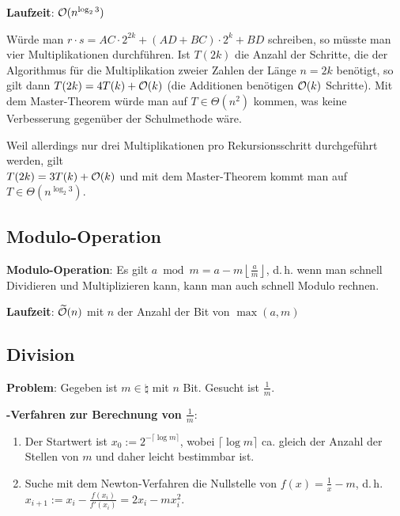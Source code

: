 \textbf{Laufzeit}:
$\mathcal{O}(n^{\log_2 3})$

\begin{Beweis}
    Würde man $r \cdot s = AC \cdot 2^{2k} + (AD + BC) \cdot 2^k + BD$ schreiben,
    so müsste man vier Multiplikationen durchführen.
    Ist $T(2k)$ die Anzahl der Schritte, die der Algorithmus für die Multiplikation zweier
    Zahlen der Länge $n = 2k$ benötigt, so gilt dann
    $T(2k) = 4T(k) + \mathcal{O}(k)$
    (die Additionen benötigen $\mathcal{O}(k)$ Schritte).
    Mit dem Master-Theorem würde man auf $T \in \Theta(n^2)$ kommen, was keine Verbesserung
    gegenüber der Schulmethode wäre.
    
    Weil allerdings nur drei Multiplikationen pro Rekursionsschritt durchgeführt werden, gilt\\
    $T(2k) = 3T(k) + \mathcal{O}(k)$ und mit dem Master-Theorem kommt man auf
    $T \in \Theta(n^{\log_2 3})$.
\end{Beweis}

\subsection{%
    Modulo-Operation%
}

\textbf{Modulo-Operation}:
Es gilt $a \bmod m = a - m \left\lfloor\frac{a}{m}\right\rfloor$,
d.\,h. wenn man schnell Dividieren und Multiplizieren kann, kann man auch schnell Modulo rechnen.

\textbf{Laufzeit}:
$\widetilde{\mathcal{O}}(n)$ mit $n$ der Anzahl der Bit von $\max(a, m)$

\pagebreak

\subsection{%
    Division%
}

\textbf{Problem}:
Gegeben ist $m \in \natural$ mit $n$ Bit.
Gesucht ist $\frac{1}{m}$.

\textbf{-Verfahren zur Berechnung von $\frac{1}{m}$}:
\begin{enumerate}
    \item
    Der Startwert ist $x_0 := 2^{-\lceil\log m \rceil}$,
    wobei $\lceil\log m \rceil$ ca. gleich der Anzahl der Stellen von $m$ und
    daher leicht bestimmbar ist.
    
    \item
    Suche mit dem Newton-Verfahren die Nullstelle von $f(x) = \frac{1}{x} - m$, d.\,h.\\
    $x_{i+1} := x_i - \frac{f(x_i)}{f'(x_i)} = 2x_i - mx_i^2$.
\end{enumerate}

